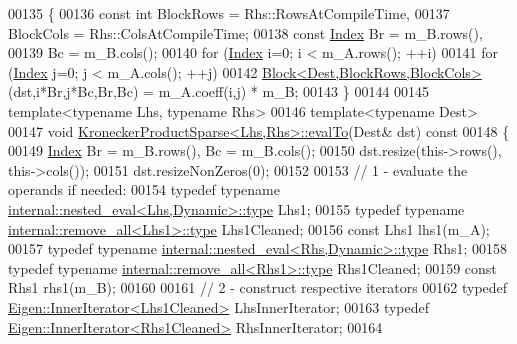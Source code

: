 \begin{DoxyCode}
00135 \textcolor{keyword}{}\{
00136   \textcolor{keyword}{const} \textcolor{keywordtype}{int} BlockRows = Rhs::RowsAtCompileTime,
00137             BlockCols = Rhs::ColsAtCompileTime;
00138   \textcolor{keyword}{const} \hyperlink{namespace_eigen_a62e77e0933482dafde8fe197d9a2cfde}{Index} Br = m\_B.rows(),
00139               Bc = m\_B.cols();
00140   \textcolor{keywordflow}{for} (\hyperlink{namespace_eigen_a62e77e0933482dafde8fe197d9a2cfde}{Index} i=0; i < m\_A.rows(); ++i)
00141     \textcolor{keywordflow}{for} (\hyperlink{namespace_eigen_a62e77e0933482dafde8fe197d9a2cfde}{Index} j=0; j < m\_A.cols(); ++j)
00142       \hyperlink{group___core___module_class_eigen_1_1_block}{Block<Dest,BlockRows,BlockCols>}(dst,i*Br,j*Bc,Br,Bc) = m\_A.coeff(i,j) 
      * m\_B;
00143 \}
00144 
00145 \textcolor{keyword}{template}<\textcolor{keyword}{typename} Lhs, \textcolor{keyword}{typename} Rhs>
00146 \textcolor{keyword}{template}<\textcolor{keyword}{typename} Dest>
00147 \textcolor{keywordtype}{void} \hyperlink{class_eigen_1_1_kronecker_product_sparse_a8b7269c23294765e0965b70b5af2557b}{KroneckerProductSparse<Lhs,Rhs>::evalTo}(Dest& dst)\textcolor{keyword}{ const}
00148 \textcolor{keyword}{}\{
00149   \hyperlink{namespace_eigen_a62e77e0933482dafde8fe197d9a2cfde}{Index} Br = m\_B.rows(), Bc = m\_B.cols();
00150   dst.resize(this->rows(), this->cols());
00151   dst.resizeNonZeros(0);
00152   
00153   \textcolor{comment}{// 1 - evaluate the operands if needed:}
00154   \textcolor{keyword}{typedef} \textcolor{keyword}{typename} \hyperlink{class_eigen_1_1internal_1_1_tensor_lazy_evaluator_writable}{internal::nested\_eval<Lhs,Dynamic>::type} Lhs1;
00155   \textcolor{keyword}{typedef} \textcolor{keyword}{typename} \hyperlink{group___sparse_core___module}{internal::remove\_all<Lhs1>::type} Lhs1Cleaned;
00156   \textcolor{keyword}{const} Lhs1 lhs1(m\_A);
00157   \textcolor{keyword}{typedef} \textcolor{keyword}{typename} \hyperlink{class_eigen_1_1internal_1_1_tensor_lazy_evaluator_writable}{internal::nested\_eval<Rhs,Dynamic>::type} Rhs1;
00158   \textcolor{keyword}{typedef} \textcolor{keyword}{typename} \hyperlink{group___sparse_core___module}{internal::remove\_all<Rhs1>::type} Rhs1Cleaned;
00159   \textcolor{keyword}{const} Rhs1 rhs1(m\_B);
00160     
00161   \textcolor{comment}{// 2 - construct respective iterators}
00162   \textcolor{keyword}{typedef} \hyperlink{class_eigen_1_1_inner_iterator}{Eigen::InnerIterator<Lhs1Cleaned>} LhsInnerIterator;
00163   \textcolor{keyword}{typedef} \hyperlink{class_eigen_1_1_inner_iterator}{Eigen::InnerIterator<Rhs1Cleaned>} RhsInnerIterator;
00164   

\end{DoxyCode}
